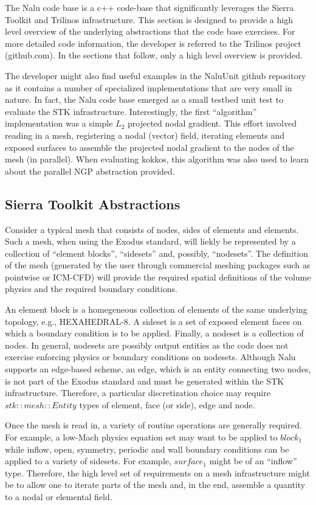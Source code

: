 The Nalu code base is a c++ code-base that significantly leverages
the Sierra Toolkit and Trilinos infrastructure. This section is designed to
provide a high level overview of the underlying abstractions that the 
code base exercises. For more detailed code information, the developer is referred to
the Trilinos project (github.com). In
the sections that follow, only a high level overview is provided. 

The developer might also find useful examples in the NaluUnit github repository
as it contains a number of specialized implementations that are very small in nature.
In fact, the Nalu code base emerged as a small testbed unit test to evaluate the STK
infrastructure. Interestingly, the first 
``algorithm'' implementation was a simple $L_2$ projected nodal gradient. This effort 
involved reading in a mesh, registering a nodal (vector) field, iterating elements 
and exposed surfaces to assemble the projected nodal gradient to the nodes of the mesh
(in parallel). When evaluating kokkos, this algorithm was also used to learn about 
the parallel NGP abstraction provided.

\subsection{Sierra Toolkit Abstractions}
Consider a typical mesh that consists of nodes, sides of elements and elements.
Such a mesh, when using the Exodus standard, will liekly be represented by a 
collection of ``element blocks'', ``sidesets'' and, possibly, ``nodesets''. The 
definition of the mesh (generated by the user through commercial meshing packages such as
pointwise or ICM-CFD) will provide the required spatial definitions of the volume physics 
and the required boundary conditions.

An element block is a homegeneous collection of elements of the same
underlying topology, e.g., HEXAHEDRAL-8. A sideset is a set of exposed element faces
on which a boundary condition is to be applied. Finally, a nodeset is a collection of 
nodes. In general, nodesets are possibly output entities as the code does not exercise
enforcing physics or boundary conditions on nodesets. Although Nalu supports an edge-based
scheme, an edge, which is an entity connecting two nodes, is not part of the Exodus standard
and must be generated within the STK infrastructure. Therefore, a particular discretization
choice may require $stk::mesh::Entity$ types of element, face (or side), edge and node.

Once the mesh is read in, a variety of routine operations are generally required. For example,
a low-Mach physics equation set may want to be applied to $block_1$ while inflow, open, symmetry, 
periodic and wall boundary conditions can be applied to a variety of sidesets. For example, 
$surface_1$ might be of an ``inflow'' type. Therefore, the high level set of requirements on a mesh 
infrastructure might be to allow one to iterate parts of the mesh and, in the end, assemble
a quantity to a nodal or elemental field. 

